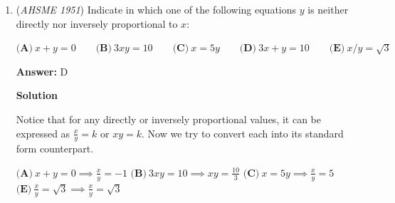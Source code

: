 \begin{enumerate}
 it happens that $c = \frac{b^2}{4a}$, then the graph of $y = f(x)$ will certainly:


 $\textbf{(A)}\ \text{have a maximum}\qquad\textbf{(B)}\ \text{have a minimum}\qquad\textbf{(C)}\ \text{be tangent to the x-axis}\\ \qquad\textbf{(D)}\ \text{be tangent to the y-axis}\qquad\textbf{(E)}\ \text{lie in one quadrant only}$

 \textbf{Answer: }C



\textbf{Solution}

The \href{https://artofproblemsolving.com/wiki/index.php?title=Discriminant}{discriminant} of $f(x)$ is $b^2 - 4ac = b^2 - 4a\left(\frac{b^2}{4a}\right) = 0$, so $f(x)$ has exactly one root (with multiplicity 2). At this root, $f(x)$ will therefore $\boxed{\textbf{(C)}\ \text{be tangent to the }x\text{-axis}}$.

 A is false as if $a$ is positive, $f(x)$ will have a minimum, not a maximum.

 B is false as if $a$ is negative, $f(x)$ will have a maximum, not a minimum.

 D is false as $f(x)$ is continuous for all real values of $x$, so it will cross through the $y$-axis instead of being tangent.

 E is false as $f(x)$ is defined for all real values of $x$, so it must lie in at least two quadrants.

 


	\item (\textit{AHSME 1951}) Indicate in which one of the following equations $y$ is neither directly nor inversely proportional to $x$: 


 $\textbf{(A)}\ x+y = 0\qquad\textbf{(B)}\ 3xy = 10\qquad\textbf{(C)}\ x = 5y \qquad\textbf{(D)}\ 3x+y = 10 \qquad\textbf{(E)}\ x/y = \sqrt{3}\qquad$

 \textbf{Answer: }D



\textbf{Solution}

Notice that for any directly or inversely proportional values, it can be expressed as $\frac{x}{y}=k$ or $xy=k$. Now we try to convert each into its standard form counterpart.

 $\textbf{(A)}\ x + y = 0\implies \frac{x}{y}=-1$
$\textbf{(B)}\ 3xy = 10\implies xy=\frac{10}{3}$
$\textbf{(C)}\ x = 5y\implies \frac{x}{y}=5$
$\textbf{(E)}\ \frac {x}{y} = \sqrt {3}\implies \frac {x}{y} = \sqrt {3}$


\end{enumerate}
